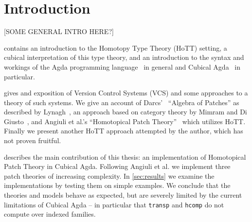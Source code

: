 \chapter{Introduction}

[SOME GENERAL INTRO HERE?]

 contains an introduction to the Homotopy Type Theory (HoTT)
setting, a cubical interpretation of this type theory, and an introduction to
the syntax and workings of the Agda programming language~\cite{Agda} in general and Cubical
Agda~\cite{vezzosi2021cubical} in particular.

 gives and exposition of Version Control Systems (VCS) and some
approaches to a theory of such systems. We give an account of
Darcs'~\cite{Darcs} ``Algebra of Patches'' as described by
Lynagh~\cite{Lynagh2006}, an approach based on category theory by Mimram and Di
Giusto~\cite{Categorical2013}, and Angiuli et al.'s ``Homotopical Patch
Theory''~\cite{Angiuli2016} which utilizes HoTT. Finally we present another
HoTT approach attempted by the author, which has not proven fruitful.

 describes the main contribution of this thesis: an
implementation of Homotopical Patch Theory in Cubical Agda. Following Angiuli et
al. we implement three patch theories of increasing complexity. In
\autoref{sec:results} we examine the implementations by testing them on simple
examples. We conclude that the theories and models behave as expected, but are
severely limited by the current limitations of Cubical Agda -- in particular
that \texttt{transp} and \texttt{hcomp} do not compute over indexed families.